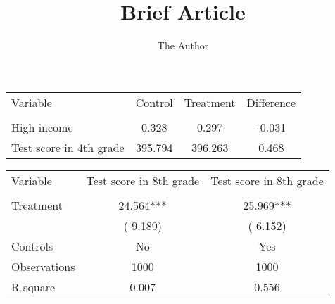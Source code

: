 \documentclass[12pt, oneside]{article}   	%
\title{Brief Article}
\author{The Author}
\begin{document}


\begin{center}

\begin{tabular}{lccc} \toprule \toprule
Variable                    &       Control & Treatment & Difference \\
\addlinespace \hline \\
High income &  0.328 &  0.297 & -0.031\\
Test score in 4th grade & 395.794 & 396.263 &  0.468\\
\hline \hline
\end{tabular}


\bigskip


\begin{tabular}{lcc} \toprule \toprule
Variable                    &       Test score in 8th grade        & Test score in 8th grade \\
\addlinespace \hline \\
Treatment & 24.564*** & 25.969***\\
& ( 9.189) & ( 6.152)\\ \addlinespace
Controls & No & Yes \\
Observations & 1000 & 1000 \\
R-square &  0.007 &  0.556 \\
\hline \hline
\end{tabular}

\end{center}
\end{document}
